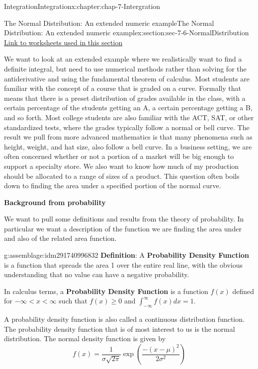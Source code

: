 \documentclass[oneside,10pt,]{book}
\newcommand{\terminology}[1]{\textbf{#1}}
\numberwithin{equation}{section}
\newcommand{\lt}{<}
\begin{document}
\begin{chapterptx}{Integration}{}{Integration}{}{}{x:chapter:chap-7-Intergration}
\begin{sectionptx}{The Normal Distribution: An extended numeric example}{}{The Normal Distribution: An extended numeric example}{}{}{x:section:sec-7-6-NormalDistribution}
\href{./Examples/Section-7-6-Examples.xlsx}{Link to worksheets used in this section}%
\par
We want to look at an extended example where we realistically want to find a definite integral, but need to use numerical methods rather than solving for the antiderivative and using the fundamental theorem of calculus. Most students are familiar with the concept of a course that is graded on a curve.  Formally that means that there is a preset distribution of grades available in the class, with a certain percentage of the students getting an A, a certain percentage getting a B, and so forth.  Most college students are also familiar with the ACT, SAT, or other standardized tests, where the grades typically follow a normal or bell curve.  The result we pull from more advanced mathematics is that many phenomena such as height, weight, and hat size, also follow a bell curve.  In a business setting, we are often concerned whether or not a portion of a market will be big enough to support a specialty store.  We also want to know how much of my production should be allocated to a range of sizes of a product.  This question often boils down to finding the area under a specified portion of the normal curve.%
\par
\terminology{Background from probability}%
\par
We want to pull some definitions and results from the theory of probability.  In particular we want a description of the function we are finding the area under and also of the related area function.%
\begin{assemblage}{}{g:assemblage:idm291740996832}%
\terminology{Definition}: A \terminology{Probability Density Function} is a function that spreads the area 1 over the entire real line, with the obvious understanding that no value can have a negative probability.%
\par
In calculus terms, a \terminology{Probability Density Function} is a function  \(f(x)\) defined for \(-\infty\lt x \lt \infty \)  such that \(f(x)\ge 0\)  and  \(\int_{-\infty}^{\infty}f(x)dx=1\).%
\end{assemblage}
A probability density function is also called a continuous distribution function.  The probability density function that is of most interest to us is the normal distribution.  The normal density function is given by%
%
\begin{equation*}
f(x)=\frac{1}{\sigma\sqrt{2\pi}}\exp\left(\frac{-(x-\mu)^2}{2\sigma^2}\right)
\end{equation*}

\end{sectionptx}
\end{chapterptx}
\end{document}
